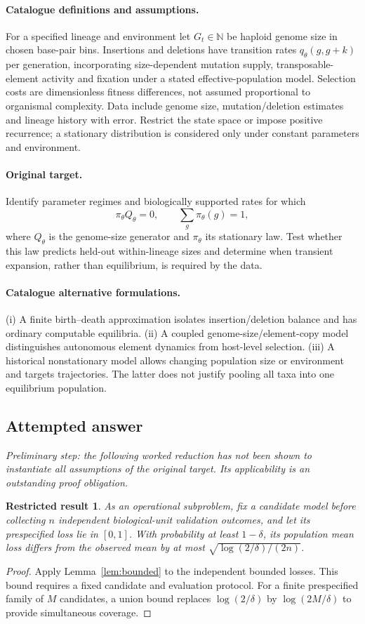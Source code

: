 \documentclass[11pt]{article}
\newcommand{\N}{\mathbb N}
\providecommand{\N}{\mathbb N}
\newtheorem{attemptresult}{Restricted result}[section]
\begin{document}
\paragraph{Catalogue definitions and assumptions.}
For a specified lineage and environment let $G_t\in\N$ be haploid genome size in chosen base-pair bins. Insertions and deletions have transition rates $q_\theta(g,g+k)$ per generation, incorporating size-dependent mutation supply, transposable-element activity and fixation under a stated effective-population model. Selection costs are dimensionless fitness differences, not assumed proportional to organismal complexity. Data include genome size, mutation/deletion estimates and lineage history with error. Restrict the state space or impose positive recurrence; a stationary distribution is considered only under constant parameters and environment.
\paragraph{Original target.}
Identify parameter regimes and biologically supported rates for which
    \[\pi_\theta Q_\theta=0,\qquad \sum_g\pi_\theta(g)=1,\]
    where $Q_\theta$ is the genome-size generator and $\pi_\theta$ its stationary law. Test whether this law predicts held-out within-lineage sizes and determine when transient expansion, rather than equilibrium, is required by the data.
\paragraph{Catalogue alternative formulations.}
(i) A finite birth--death approximation isolates insertion/deletion balance and has ordinary computable equilibria. (ii) A coupled genome-size/element-copy model distinguishes autonomous element dynamics from host-level selection. (iii) A historical nonstationary model allows changing population size or environment and targets trajectories. The latter does not justify pooling all taxa into one equilibrium population.
\subsection{Attempted answer}
\noindent\emph{Preliminary step: the following worked reduction has not been shown to instantiate all assumptions of the original target. Its applicability is an outstanding proof obligation.}

\begin{attemptresult}
As an operational subproblem, fix a candidate model before collecting $n$ independent biological-unit validation outcomes, and let its prespecified loss lie in $[0,1]$. With probability at least $1-\delta$, its population mean loss differs from the observed mean by at most $\sqrt{\log(2/\delta)/(2n)}$.
\end{attemptresult}
\begin{proof}
Apply Lemma~\ref{lem:bounded} to the independent bounded losses. This bound requires a fixed candidate and evaluation protocol. For a finite prespecified family of $M$ candidates, a union bound replaces $\log(2/\delta)$ by $\log(2M/\delta)$ to provide simultaneous coverage.
\end{proof}
\end{document}
